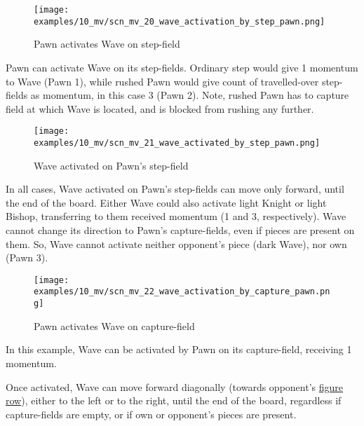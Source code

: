 \vspace*{-1.4\baselineskip}
\noindent
\begin{figure}[!h]
\texttt{[image: examples/10\_mv/scn\_mv\_20\_wave\_activation\_by\_step\_pawn.png]}
\caption{Pawn activates Wave on step-field}
\label{fig:scn_mv_20_wave_activation_by_step_pawn}
\end{figure}

Pawn can activate Wave on its step-fields. Ordinary step would give 1 momentum to
Wave (Pawn 1), while rushed Pawn would give count of travelled-over step-fields as
momentum, in this case 3 (Pawn 2). Note, rushed Pawn has to capture field at which
Wave is located, and is blocked from rushing any further.

\clearpage %

\vspace*{-2.1\baselineskip}
\noindent
\begin{figure}[!h]
\texttt{[image: examples/10\_mv/scn\_mv\_21\_wave\_activated\_by\_step\_pawn.png]}
\caption{Wave activated on Pawn's step-field}
\label{fig:scn_mv_21_wave_activated_by_step_pawn}
\end{figure}

In all cases, Wave activated on Pawn's step-fields can move only forward, until the end
of the board. Either Wave could also activate light Knight or light Bishop, transferring
to them received momentum (1 and 3, respectively). Wave cannot change its direction to
Pawn's capture-fields, even if pieces are present on them. So, Wave cannot activate neither
opponent's piece (dark Wave), nor own (Pawn 3).

\clearpage %

\vspace*{-2.1\baselineskip}
\noindent
\begin{figure}[!h]
\texttt{[image: examples/10\_mv/scn\_mv\_22\_wave\_activation\_by\_capture\_pawn.png]}
\caption{Pawn activates Wave on capture-field}
\label{fig:scn_mv_22_wave_activation_by_capture_pawn}
\end{figure}

In this example, Wave can be activated by Pawn on its capture-field, receiving 1 momentum.

Once activated, Wave can move forward diagonally (towards opponent's
\hyperref[sec:Terms/Figure row]{figure row}), either to the left or to the right, until the
end of the board, regardless if capture-fields are empty, or if own or opponent's pieces are
present.

